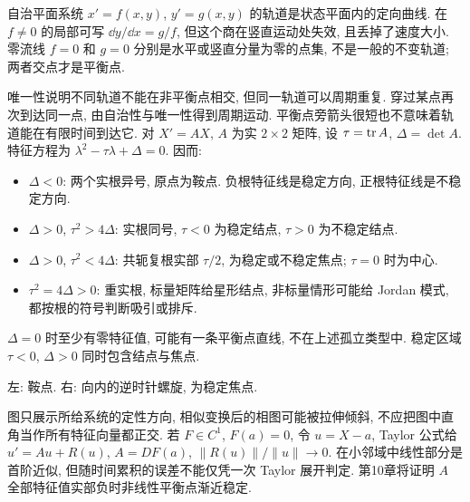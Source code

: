 自治平面系统 $x'=f(x,y)$, $y'=g(x,y)$ 的轨道是状态平面内的定向曲线. 在 $f\ne0$ 的局部可写 $\dd y/\dd x=g/f$, 但这个商在竖直运动处失效, 且丢掉了速度大小. 零流线 $f=0$ 和 $g=0$ 分别是水平或竖直分量为零的点集, 不是一般的不变轨道; 两者交点才是平衡点.

唯一性说明不同轨道不能在非平衡点相交, 但同一轨道可以周期重复. 穿过某点再次到达同一点, 由自治性与唯一性得到周期运动. 平衡点旁箭头很短也不意味着轨道能在有限时间到达它.
对 $X'=AX$, $A$ 为实 $2\times2$ 矩阵, 设 $\tau=\operatorname{tr} A$, $\Delta=\det A$. 特征方程为 $\lambda^2-\tau\lambda+\Delta=0$. 因而:
\begin{itemize}
\item $\Delta<0$: 两个实根异号, 原点为鞍点. 负根特征线是稳定方向, 正根特征线是不稳定方向.
\item $\Delta>0$, $\tau^2>4\Delta$: 实根同号, $\tau<0$ 为稳定结点, $\tau>0$ 为不稳定结点.
\item $\Delta>0$, $\tau^2<4\Delta$: 共轭复根实部 $\tau/2$, 为稳定或不稳定焦点; $\tau=0$ 时为中心.
\item $\tau^2=4\Delta>0$: 重实根, 标量矩阵给星形结点, 非标量情形可能给 Jordan 模式, 都按根的符号判断吸引或排斥.
\end{itemize}
$\Delta=0$ 时至少有零特征值, 可能有一条平衡点直线, 不在上述孤立类型中. 稳定区域 $\tau<0$, $\Delta>0$ 同时包含结点与焦点.
\begin{center}

左: 鞍点. 右: 向内的逆时针螺旋, 为稳定焦点.
\end{center}
图只展示所给系统的定性方向, 相似变换后的相图可能被拉伸倾斜, 不应把图中直角当作所有特征向量都正交.
若 $F\in C^1$, $F(a)=0$, 令 $u=X-a$, Taylor 公式给 $u'=Au+R(u)$, $A=DF(a)$, $\|R(u)\|/\|u\|\to0$. 在小邻域中线性部分是首阶近似, 但随时间累积的误差不能仅凭一次 Taylor 展开判定. 第10章将证明 $A$ 全部特征值实部负时非线性平衡点渐近稳定.

